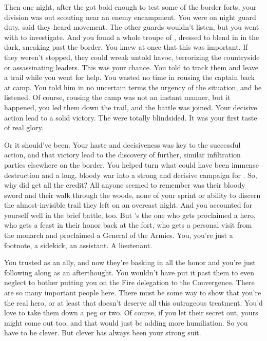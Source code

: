\documentclass[char]{iron}
\begin{document}
Then one night, after the \sMulanCountryPeople{} got bold enough to
test some of the border forts, your division was out scouting near an
enemy encampment.  You were on night guard duty.  \cMulan{\first} said
they heard movement.  The other guards wouldn't listen, but you went
with \cMulan{\first} to investigate.  And you found a whole troupe of
\sMulanCountryPeople{}, dressed to blend in in the dark, sneaking past the
border.  You knew at once that this was important.  If they weren't stopped,
they could wreak untold havoc, terrorizing the countryside or assassinating
leaders.  This was your chance.  You told \cMulan{\first} to track them
and leave a trail while you went for help.  You wasted no time in rousing
the captain back at camp.  You told him in no uncertain terms the urgency
of the situation, and he listened.  Of course, rousing the camp was not 
an instant manner, but it happened, you led them down the trail, and the
battle was joined.  Your decisive action lead to a solid victory.  The
\sMulanCountryPeople{} were totally blindsided.  It was your first taste
of real glory.

Or it should've been.  Your haste and decisiveness was key to the
successful action, and that victory lead to the discovery of further,
similar infiltration parties elsewhere on the border.  You helped turn
what could have been immense destruction and a long, bloody war into a
strong and decisive campaign for \sHomeCountry{}.  So, why did
\cMulan{\first} get all the credit?  All anyone seemed to remember was
their bloody sword and their walk through the woods, none of your sprint
or ability to discern the almost-invisible trail they left on an
overcast night.  And you accounted for yourself well in the brief
battle, too.  But \cMulan{\first}'s the one who gets proclaimed a
hero, who gets a feast in their honor back at the fort, who gets a
personal visit from the monarch and proclaimed a General of the
Armies.  You, you're just a footnote, a sidekick, an assistant.  A
lieutenant.

You trusted \cMulan{\first} as an ally, and now they're basking in all
the honor and you're just following along as an afterthought.  You wouldn't
have put it past them to even neglect to bother putting you on the Fire
delegation to the Convergence.  There are so many important people
here.  There must be some way to show that you're the real hero, or at least
that \cMulan{\first} doesn't deserve all this outrageous treatment.  You'd
love to take them down a peg or two.  Of course, if you let their secret out,
yours might come out too, and that would just be adding more humiliation.
So you have to be clever.  But clever has always been your strong suit.
\end{document}
